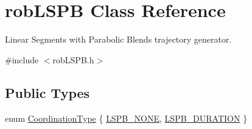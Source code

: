\hypertarget{classrob_l_s_p_b}{\section{rob\-L\-S\-P\-B Class Reference}
\label{classrob_l_s_p_b}
}


Linear Segments with Parabolic Blends trajectory generator.  




{\ttfamily \#include $<$rob\-L\-S\-P\-B.\-h$>$}

\subsection*{Public Types}
\begin{DoxyCompactItemize}
\item 
enum \hyperlink{classrob_l_s_p_b_a8feec61f7c94670dbdbe75e63dec8496}{Coordination\-Type} \{ \hyperlink{classrob_l_s_p_b_a8feec61f7c94670dbdbe75e63dec8496a6183520633c3003062fc1a7c013ced4b}{L\-S\-P\-B\-\_\-\-N\-O\-N\-E}, 
\hyperlink{classrob_l_s_p_b_a8feec61f7c94670dbdbe75e63dec8496a69d9016e53da35bc25239de96393ef0e}{L\-S\-P\-B\-\_\-\-D\-U\-R\-A\-T\-I\-O\-N}
 \}
\end{DoxyCompactItemize}
